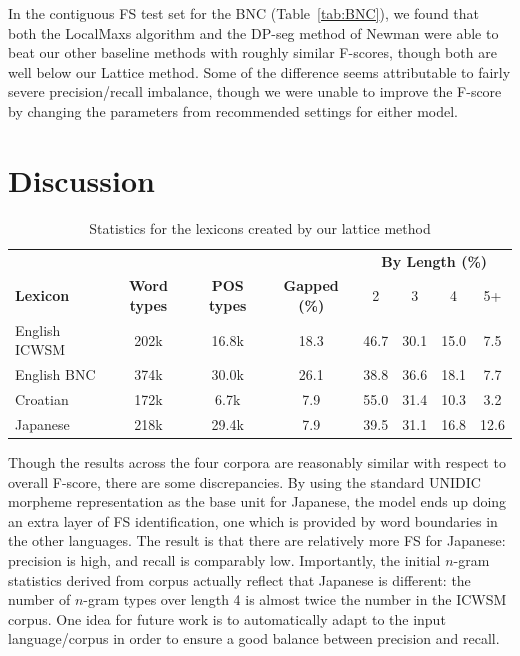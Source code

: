 \documentclass[11pt,letterpaper]{article}
\newcommand{\tabref}[2][]{Table#1~\ref{#2}\xspace}
\begin{document}
In the contiguous FS test set for the BNC (\tabref{tab:BNC}), we found that both the LocalMaxs algorithm and the DP-seg method of Newman \cite{Newman12} were able to beat our other baseline methods with roughly similar F-scores, though both are well below our Lattice method. Some of the difference seems attributable to fairly severe precision/recall imbalance, though we were unable to improve the F-score by changing the parameters from recommended settings for either model.


\section{Discussion} \label{sec:discussion}


\begin{table}[!bt]
 
 \begin{center}
 \begin{tabular}{lccccccc}
\toprule
& & & & \multicolumn{4}{c}{\bf{By Length (\%) }} \\
       \cmidrule(lr){5-8}	
\bf{Lexicon} & \bf{Word types} & \bf{POS types} & \bf{Gapped} (\%) & 2 & 3 & 4 & 5+ \\ 
\midrule
English ICWSM & 202k & 16.8k & 18.3 & 46.7 & 30.1 & 15.0 & 7.5  \\
English BNC & 374k &  30.0k& 26.1& 38.8 & 36.6 & 18.1 & 7.7 \\
Croatian & 172k & 6.7k & 7.9& 55.0& 31.4 & 10.3 & 3.2 \\
Japanese & 218k &  29.4k &7.9& 39.5 & 31.1& 16.8 & 12.6 \\
\bottomrule
\end{tabular}
  \caption{Statistics for the lexicons created by our lattice method}
	 \label{tab:lexstats}

 \end{center}


 \end{table}

Though the results across the four corpora are reasonably similar with respect to overall F-score, there are some discrepancies. By using the standard UNIDIC morpheme representation as the base unit for Japanese, the model ends up doing an extra layer of FS identification, one which is provided by word boundaries in the other languages. The result is that there are relatively more FS for Japanese: precision is high, and recall is comparably low.  Importantly, the initial $n$-gram statistics derived from corpus actually reflect that Japanese is different: the number of $n$-gram types over length 4 is almost twice the number in the ICWSM corpus. One idea for future work is to automatically adapt to the input language/corpus in order to ensure a good balance between precision and recall.
\end{document}
